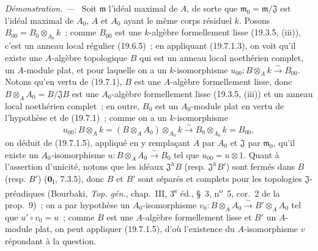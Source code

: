 \documentclass[10pt,oneside]{book}
\newenvironment{proof}{%
  \par\medskip\noindent\textit{Démonstration. ---\ }}{\par}
\begin{document}
\begin{proof}
Soit $\mathfrak m$ l'idéal maximal de $A$, de sorte que
$\mathfrak m_0=\mathfrak m/\mathfrak J$ est l'idéal maximal de $A_0$, $A$ et
$A_0$ ayant le même corps résiduel $k$. Posons
$B_{00}=B_0\otimes_{A_0}k$~; comme $B_{00}$ est une $k$-algèbre formellement
lisse (19.3.5, (iii)), c'est un anneau local régulier (19.6.5)~; en appliquant
(19.7.1.3), on voit qu'il existe une $A$-algèbre topologique $B$ qui est un
anneau local noethérien complet, un $A$-module plat, et pour laquelle on a un
$k$-isomorphisme
$u_{00}:B\otimes_A k\xrightarrow{\sim}B_{00}$. Notons qu'en vertu de (19.7.1),
$B$ est une $A$-algèbre formellement lisse, donc
$B\otimes_A A_0=B/\mathfrak JB$ est une $A_0$-algèbre formellement lisse
(19.3.5, (iii)) et un anneau local noethérien complet~; en outre, $B_0$ est un
$A_0$-module plat en vertu de l'hypothèse et de (19.7.1)~; comme on a un
$k$-isomorphisme
\[
  u_{00}:B\otimes_A k=(B\otimes_A A_0)\otimes_{A_0}k
  \xrightarrow{\sim}B_0\otimes_{A_0}k=B_{00},
\]
on déduit de (19.7.1.5), appliqué en y remplaçant $A$ par $A_0$ et
$\mathfrak J$ par $\mathfrak m_0$, qu'il existe un $A_0$-isomorphisme
$u:B\otimes_A A_0\xrightarrow{\sim}B_0$ tel que $u_{00}=u\otimes1$. Quant à
l'assertion d'unicité, notons que les idéaux $\mathfrak J^hB$ (resp.
$\mathfrak J^hB'$) sont fermés dans $B$ (resp. $B'$)
($\mathbf 0_{\mathrm I}$, 7.3.5), donc $B$ et $B'$ sont séparés et complets
pour les topologies $\mathfrak J$-préadiques (Bourbaki, \emph{Top. gén.},
chap.~III, 3\textsuperscript{e} éd., §~3, n\textsuperscript{o}~5, cor.~2 de la
prop.~9)~; on a par hypothèse un $A_0$-isomorphisme
$v_0:B\otimes_A A_0\xrightarrow{\sim}B'\otimes_A A_0$ tel que
$u'\circ v_0=u$~; comme $B$ est une $A$-algèbre formellement lisse et $B'$ un
$A$-module plat, on peut appliquer (19.7.1.5), d'où l'existence du
$A$-isomorphisme $v$ répondant à la question.
\end{proof}
\end{document}
